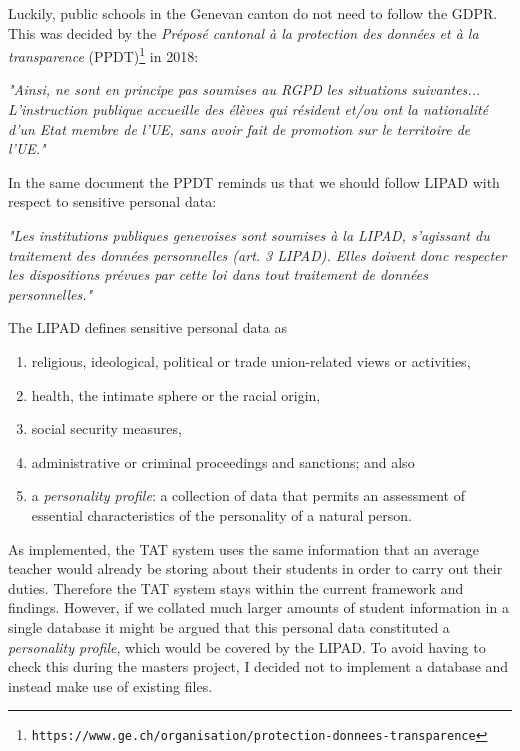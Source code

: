 \documentclass[10pt]{article}
\begin{document}
Luckily, public schools in the Genevan canton do not need to follow the GDPR. This was decided by the \emph{Préposé cantonal à la protection des données et à la transparence} (PPDT)\footnote{\texttt{https://www.ge.ch/organisation/protection-donnees-transparence}} in 2018:
\begin{center} 
\emph{"Ainsi, ne sont en principe pas soumises au RGPD les situations suivantes... L’instruction publique accueille des élèves qui résident et/ou ont la nationalité d’un Etat membre de l’UE, sans avoir fait de promotion sur le territoire de l’UE."}\cite[p. 3]{PPDT18}
\end{center}
In the same document the PPDT reminds us that we should follow LIPAD with respect to sensitive personal data:
\begin{center} 
\emph{"Les institutions publiques genevoises sont soumises à la LIPAD, s'agissant du traitement des données personnelles (art. 3 LIPAD). Elles doivent donc respecter les dispositions prévues par cette loi dans tout traitement de données personnelles."}\cite[p. 1]{PPDT18}
\end{center}
The LIPAD defines sensitive personal data as
\begin{enumerate}
\item religious, ideological, political or trade union-related views or activities,
\item health, the intimate sphere or the racial origin,
\item social security measures,
\item administrative or criminal proceedings and sanctions; and also
\item a \emph{personality profile}: a collection of data that permits an assessment of essential characteristics of the personality of a natural person.
\end{enumerate}

As implemented, the TAT system uses the same information that an average teacher would already be storing about their students in order to carry out their duties. Therefore the TAT system stays within the current framework and findings. However, if we collated much larger amounts of student information in a single database it might be argued that this personal data constituted a \emph{personality profile}, which would be covered by the LIPAD. To avoid having to check this during the masters project, I decided not to implement a database and instead make use of existing files.
\end{document}
